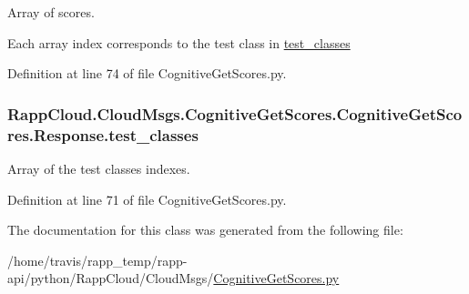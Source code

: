 Array of scores. 

Each array index corresponds to the test class in \hyperlink{classRappCloud_1_1CloudMsgs_1_1CognitiveGetScores_1_1CognitiveGetScores_1_1Response_ad11c42b639516bcbb2469f13f5d5b0d7}{test\-\_\-classes} 

Definition at line 74 of file Cognitive\-Get\-Scores.\-py.

\hypertarget{classRappCloud_1_1CloudMsgs_1_1CognitiveGetScores_1_1CognitiveGetScores_1_1Response_ad11c42b639516bcbb2469f13f5d5b0d7}{
\subsubsection[{test\-\_\-classes}]{\setlength{\rightskip}{0pt plus 5cm}Rapp\-Cloud.\-Cloud\-Msgs.\-Cognitive\-Get\-Scores.\-Cognitive\-Get\-Scores.\-Response.\-test\-\_\-classes}}\label{classRappCloud_1_1CloudMsgs_1_1CognitiveGetScores_1_1CognitiveGetScores_1_1Response_ad11c42b639516bcbb2469f13f5d5b0d7}


Array of the test classes indexes. 



Definition at line 71 of file Cognitive\-Get\-Scores.\-py.



The documentation for this class was generated from the following file\-:\begin{DoxyCompactItemize}
\item 
/home/travis/rapp\-\_\-temp/rapp-\/api/python/\-Rapp\-Cloud/\-Cloud\-Msgs/\hyperlink{CognitiveGetScores_8py}{Cognitive\-Get\-Scores.\-py}\end{DoxyCompactItemize}
